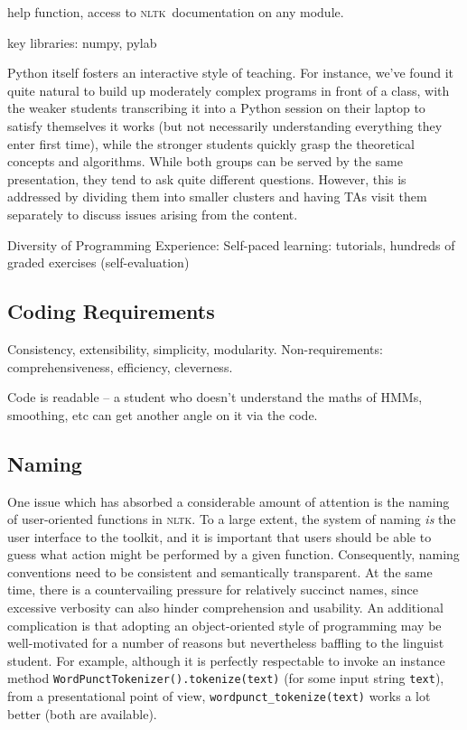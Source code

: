 \documentclass[11pt]{article}
\newcommand{\NLTK}{\textsc{nltk}}
\newcommand{\code}[1]{\texttt{\small #1}}
\begin{document}
help function, access to \NLTK\ documentation on any module.

key libraries: numpy, pylab

Python itself fosters an
interactive style of teaching.  For instance, we've found it quite
natural to build up moderately complex programs in front of a class,
with the weaker students transcribing it into a Python session on
their laptop to satisfy themselves it works (but not necessarily
understanding everything they enter first time), while the stronger
students quickly grasp the theoretical concepts and algorithms.  While
both groups can be served by the same presentation, they tend to ask
quite different questions.  However, this is addressed by dividing
them into smaller clusters and having TAs visit them separately to
discuss issues arising from the content.

Diversity of Programming Experience:
Self-paced learning: tutorials, hundreds of graded exercises (self-evaluation)



\subsection{Coding Requirements}

Consistency, extensibility, simplicity, modularity.
Non-requirements: comprehensiveness, efficiency, cleverness.
\cite{LoperBird02}

Code is readable -- a student who doesn't understand the maths of HMMs,
smoothing, etc can get another angle on it via the code.

\subsection{Naming}

One issue which has absorbed a considerable amount of attention is the
naming of user-oriented functions in \NLTK. To a large extent, the
system of naming \emph{is} the user interface to the toolkit, and it is
important that users should be able to guess what action might be
performed by a given function. Consequently, naming conventions need
to be consistent and semantically transparent. At the same time, there is a
countervailing pressure for relatively succinct names, since excessive verbosity
can also hinder comprehension and usability. An additional
complication is that adopting an object-oriented style of programming
may be well-motivated for a number of reasons but nevertheless
baffling to the linguist student. For example, although it is
perfectly respectable to invoke an instance method
\code{WordPunctTokenizer().tokenize(text)} (for some input
string \code{text}), from a presentational point of view, 
\code{wordpunct\_tokenize(text)} works a lot better
(both are available).
\end{document}
